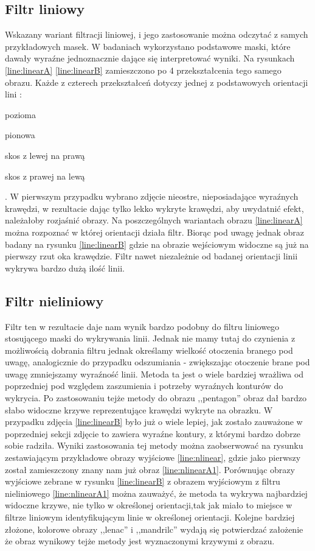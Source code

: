 \documentclass{classrep}
\begin{document}
\subsection{Filtr liniowy}
Wskazany wariant filtracji liniowej, i jego zastosowanie można odczytać z samych przykładowych masek. W badaniach wykorzystano podstawowe maski, które dawały wyraźne jednoznacznie dające się interpretować wyniki. Na rysunkach \ref{line:linearA} \ref{line:linearB}  zamieszczono po 4 przekształcenia tego samego obrazu. Każde z czterech przekształceń dotyczy jednej z podstawowych orientacji lini :
 \begin{inparaenum}
\item pozioma
\item pionowa
\item skos z lewej na prawą
\item skos z prawej na lewą
\end{inparaenum}. W pierwszym przypadku wybrano zdjęcie nieostre, nieposiadające wyraźnych krawędzi, w rezultacie dając tylko lekko wykryte krawędzi, aby uwydatnić efekt, należałoby rozjaśnić obrazy. Na poszczególnych wariantach obrazu  \ref{line:linearA} można rozpoznać w której orientacji działa filtr. Biorąc pod uwagę jednak obraz badany na rysunku \ref{line:linearB} gdzie na obrazie wejściowym widoczne są już na pierwszy rzut oka krawędzie. Filtr nawet niezależnie od badanej orientacji linii wykrywa bardzo dużą ilość linii.


\subsection{Filtr nieliniowy}

Filtr ten w rezultacie daje nam wynik bardzo podobny do filtru liniowego stosującego maski do wykrywania linii. Jednak nie mamy tutaj do czynienia z możliwością dobrania filtru jednak określamy wielkość otoczenia branego pod uwagę, analogicznie do przypadku odszumiania - zwiększając otoczenie brane pod uwagę zmniejszamy wyraźność linii. Metoda ta jest o wiele bardziej wrażliwa od poprzedniej pod względem zaszumienia i potrzeby wyraźnych konturów do wykrycia. Po zastosowaniu tejże metody do obrazu ,,pentagon'' obraz dał bardzo słabo widoczne krzywe reprezentujące krawędzi wykryte na obrazku. W przypadku zdjęcia \ref{line:linearB} było już o wiele lepiej, jak zostało zauważone w poprzedniej sekcji zdjęcie to zawiera wyraźne kontury, z którymi bardzo dobrze sobie radziła. Wyniki zastosowania tej metody można zaobserwować na rysunku zestawiającym przykładowe obrazy wyjściowe \ref{line:nlinear}, gdzie jako pierwszy został zamieszczony znany nam już obraz \ref{line:nlinearA1}. Porównując obrazy wyjściowe zebrane w  rysunku \ref{line:linearB} z obrazem wyjściowym z filtru nieliniowego \ref{line:nlinearA1} można zauważyć, że metoda ta wykrywa najbardziej widoczne krzywe, nie tylko w określonej orientacji,tak jak miało to miejsce w filtrze liniowym identyfikującym linie w określonej orientacji. Kolejne bardziej złożone, kolorowe obrazy ,,lenac'' i ,,mandrilc'' wydają się potwierdzać założenie że obraz wynikowy tejże metody jest wyznaczonymi krzywymi z obrazu.
\end{document}
